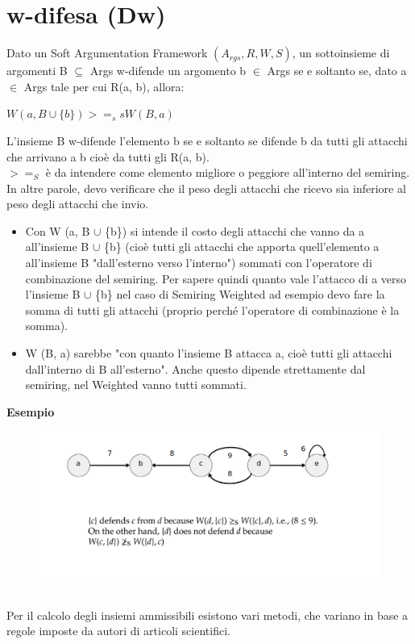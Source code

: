 \section{w-difesa (Dw)}
Dato un Soft Argumentation Framework $(A_{rgs} , R, W, S)$, un sottoinsieme di
argomenti B $\subseteq$ Args w-difende un argomento b $\in$ Args se e soltanto
se, dato a $\in$ Args tale per cui R(a, b), allora:
\begin{center}
    $W (a, B \cup \{b\}) >=_s s W (B, a)$
\end{center}
L'insieme B w-difende l'elemento b se e soltanto se difende b da tutti gli
attacchi che arrivano a b cioè da tutti gli R(a, b). \\$>=_S$ è da intendere
    come elemento migliore o peggiore all'interno del semiring. \\In altre parole,
    devo verificare che il peso degli attacchi che ricevo sia inferiore al peso
    degli attacchi che invio.
    \begin{itemize}
        \item Con W (a, B $\cup$ \{b\}) si intende il costo degli attacchi che
              vanno da a all'insieme B $\cup$ \{b\} (cioè tutti gli attacchi che
              apporta quell'elemento a all'insieme B "dall'esterno verso l'interno")
              sommati con l'operatore di combinazione del semiring. Per sapere quindi
              quanto vale l'attacco di a verso l'insieme B $\cup$ \{b\} nel caso di
              Semiring Weighted ad esempio devo fare la somma di tutti gli attacchi
              (proprio perché l'operatore di combinazione è la somma).
        \item W (B, a) sarebbe "con quanto l'insieme B attacca a, cioè tutti gli
              attacchi dall'interno di B all'esterno". Anche questo dipende
              strettamente dal semiring, nel Weighted vanno tutti sommati.
    \end{itemize}
    \textbf{Esempio}
    \begin{figure}[htp]
        \centering
        \includegraphics[width=14cm, keepaspectratio]{img/Cap6/srs2.png}
    \end{figure}
    \\Per il calcolo degli insiemi ammissibili esistono vari metodi, che variano
    in base a regole imposte da autori di articoli scientifici.

